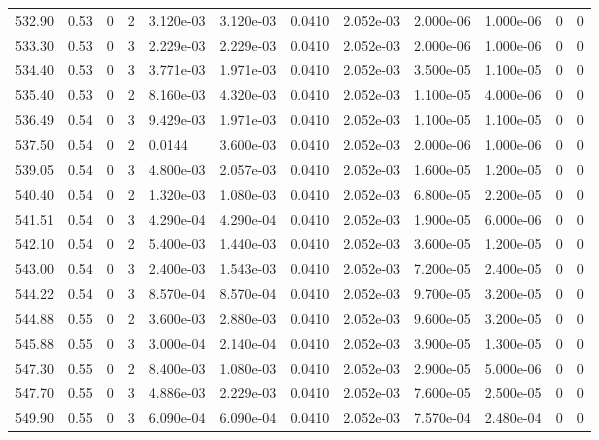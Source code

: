 \documentclass[preview]{standalone}
\begin{document}
{{{{{{{{{{{{{{{{{\begin{tabular}{L{1.2cm}C{1.2cm} C{0.3cm}C{0.5cm} C{1.4cm}C{1.4cm} C{1.4cm}C{1.4cm} C{1.6cm}C{1.6cm} C{1.6cm}C{1.6cm}}
  532.90  &  0.53  & 0     &  2 &  3.120e-03  & 3.120e-03  &  0.0410&   2.052e-03& 2.000e-06 & 1.000e-06   &  0 & 0  \\ 
  533.30  &  0.53  & 0     &  3 &  2.229e-03  & 2.229e-03  &  0.0410&   2.052e-03& 2.000e-06 & 1.000e-06   &  0 & 0  \\ 
  534.40  &  0.53  & 0     &  3 &  3.771e-03  & 1.971e-03  &  0.0410&   2.052e-03& 3.500e-05 & 1.100e-05   &  0 & 0  \\ 
  535.40  &  0.53  & 0     &  2 &  8.160e-03  & 4.320e-03  &  0.0410&   2.052e-03& 1.100e-05 & 4.000e-06   &  0 & 0  \\ 
  536.49  &  0.54  & 0     &  3 &  9.429e-03  & 1.971e-03  &  0.0410&   2.052e-03& 1.100e-05 & 1.100e-05   &  0 & 0  \\ 
  537.50  &  0.54  & 0     &  2 &  0.0144  & 3.600e-03  &  0.0410&   2.052e-03& 2.000e-06 & 1.000e-06   &  0 & 0  \\ 
  539.05  &  0.54  & 0     &  3 &  4.800e-03  & 2.057e-03  &  0.0410&   2.052e-03& 1.600e-05 & 1.200e-05   &  0 & 0  \\ 
  540.40  &  0.54  & 0     &  2 &  1.320e-03  & 1.080e-03  &  0.0410&   2.052e-03& 6.800e-05 & 2.200e-05   &  0 & 0  \\ 
  541.51  &  0.54  & 0     &  3 &  4.290e-04  & 4.290e-04  &  0.0410&   2.052e-03& 1.900e-05 & 6.000e-06   &  0 & 0  \\ 
  542.10  &  0.54  & 0     &  2 &  5.400e-03  & 1.440e-03  &  0.0410&   2.052e-03& 3.600e-05 & 1.200e-05   &  0 & 0  \\ 
  543.00  &  0.54  & 0     &  3 &  2.400e-03  & 1.543e-03  &  0.0410&   2.052e-03& 7.200e-05 & 2.400e-05   &  0 & 0  \\ 
  544.22  &  0.54  & 0     &  3 &  8.570e-04  & 8.570e-04  &  0.0410&   2.052e-03& 9.700e-05 & 3.200e-05   &  0 & 0  \\ 
  544.88  &  0.55  & 0     &  2 &  3.600e-03  & 2.880e-03  &  0.0410&   2.052e-03& 9.600e-05 & 3.200e-05   &  0 & 0  \\ 
  545.88  &  0.55  & 0     &  3 &  3.000e-04  & 2.140e-04  &  0.0410&   2.052e-03& 3.900e-05 & 1.300e-05   &  0 & 0  \\ 
  547.30  &  0.55  & 0     &  2 &  8.400e-03  & 1.080e-03  &  0.0410&   2.052e-03& 2.900e-05 & 5.000e-06   &  0 & 0  \\ 
  547.70  &  0.55  & 0     &  3 &  4.886e-03  & 2.229e-03  &  0.0410&   2.052e-03& 7.600e-05 & 2.500e-05   &  0 & 0  \\ 
  549.90  &  0.55  & 0     &  3 &  6.090e-04  & 6.090e-04  &  0.0410&   2.052e-03& 7.570e-04 & 2.480e-04   &  0 & 0  \\ 

\end{tabular}}}}}}}}}}}}}}}}}}
\end{document}
